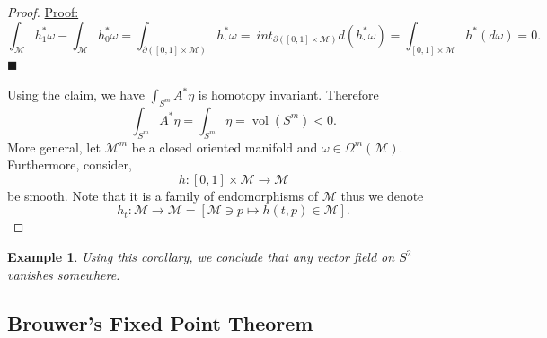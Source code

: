 \documentclass[8pt]{article}
\newtheorem{example}{Example}[section]
\newenvironment{claimproof}[1]{\par\noindent\underline{Proof:}\space#1}{\hfill $\blacksquare$}
\DeclareMathOperator{\vol}{vol}
\newcommand{\M}[0]{\mathcal{M}}
\begin{document}
\begin{proof}
\begin{claimproof}
\begin{equation*}
      \int_\M h^*_1\omega - \int_\M h^*_0\omega = \int_{\partial([0,1]\times\M)}h^*_{\cdot}\omega = \
      int_{\partial([0,1]\times\M)}d(h_\cdot^*\omega) = \int_{[0,1]\times\M}h^*(d\omega) = 0.
    \end{equation*}
  \end{claimproof}
  \par Using the claim, we have $\int_{S^m}A^*\eta$ is homotopy invariant. Therefore 
  \begin{equation*}
    \int_{S^m}A^*\eta = \int_{S^m}\eta  = \vol(S^m)<0.
  \end{equation*}
  More general, let $\M^m$ be a closed oriented manifold and $\omega\in\Omega^m(\M)$. Furthermore, consider,
  \begin{equation*}
    h:[0,1]\times\M\to\M
  \end{equation*}
  be smooth. Note that it is a family of endomorphisms of $\M$ thus we denote 
  \begin{equation*}
    h_t:\M\to\M = [\M\ni p\mapsto h(t,p)\in\M].
  \end{equation*}
\end{proof}
\begin{example}
  Using this corollary, we conclude that any vector field on $S^2$ vanishes somewhere.
\end{example}
\subsection{Brouwer's Fixed Point Theorem}
\end{document}
